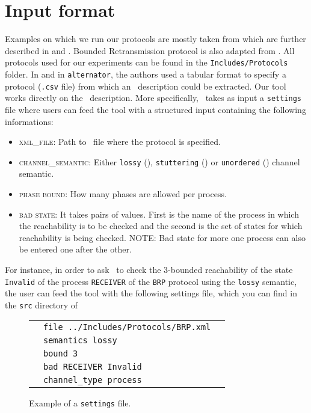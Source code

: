 \section{Input format}
\label{sec:input}

Examples on which we run our protocols are mostly taken from \cite{JRSVgit} 
which are further described in \cite{MPSV11} and \cite{RSV11}.
Bounded Retransmission protocol is also adapted from \cite{AABJ04}.
All protocols used for our experiments can be found in the \texttt{Includes/Protocols} folder.
%
In \cite{JRSVgit} and in \texttt{alternator}, the authors used a tabular format to specify a protocol (\texttt{.csv} file)
from which an \xml\ description could be extracted.
Our tool works directly on the \xml\ description.
%
More specifically, \MPass\ takes as input a \texttt{settings} file where users can feed the tool with a structured input containing the following informations:

\begin{itemize}
\item \textsc{xml\_file}: Path to \xml\ file where the protocol is specified.
\item \textsc{channel\_semantic}: Either \texttt{lossy} (\LCS), \texttt{stuttering} (\SLCS) or \texttt{unordered} (\UCS) channel semantic.
\item \textsc{phase bound}: How many phases are allowed per process.
\item \textsc{bad state}: It takes pairs of values.
%
First is the name of the process in which the reachability is to be checked and the second is the set of states for which reachability is being checked.
NOTE: Bad state for more one process can also be entered one after the other.
\end{itemize}

For instance, in order to ask \MPass\ to check the $3$-bounded reachability
of the state \texttt{Invalid} of the process \texttt{RECEIVER} of the \texttt{BRP} protocol
using the \texttt{lossy} semantic,
the user can feed the tool with the following settings file, which you can find in the \texttt{src} directory of \MPass\:

\begin{figure}[h]
\begin{center}
\begin{tabular}{ c l c}
&\texttt{file ../Includes/Protocols/BRP.xml}&\\
&\texttt{semantics lossy}&\\
&\texttt{bound 3}&\\
&\texttt{bad RECEIVER Invalid}&\\
&\texttt{channel\_type process}&\\
\end{tabular}
\end{center}
\caption{Example of a \texttt{settings} file.}
\label{fig:settings:file}
\end{figure}

